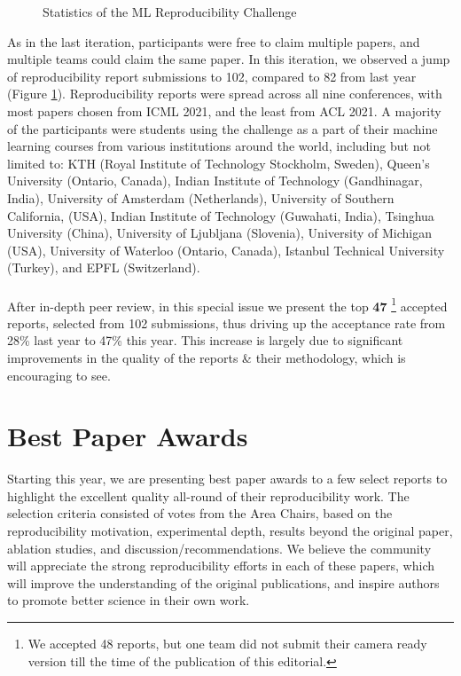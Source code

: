 \begin{figure}%
    \centering
    \qquad
    \caption{Statistics of the ML Reproducibility Challenge}%
    \label{fig:rcstats}%
\end{figure}

As in the last iteration, participants were free to claim multiple papers, and multiple teams could claim the same paper. In this iteration, we observed a jump of reproducibility report submissions to 102, compared to 82 from last year (Figure \ref{fig:rcstats}). Reproducibility reports were spread across all nine conferences, with most papers chosen from ICML 2021, and the least from ACL 2021. A majority of the participants were students using the challenge as a part of their machine learning courses from various institutions around the world, including but not limited to: KTH (Royal Institute of Technology Stockholm, Sweden), Queen's University (Ontario, Canada), Indian Institute of Technology (Gandhinagar, India), University of Amsterdam (Netherlands), University of Southern California, (USA), Indian Institute of Technology (Guwahati, India), Tsinghua University (China), University of Ljubljana (Slovenia), University of Michigan (USA), University of Waterloo (Ontario, Canada), Istanbul Technical University (Turkey), and EPFL (Switzerland).
\\
\\
After in-depth peer review, in this special issue we present the top \textbf{47} \footnote{We accepted 48 reports, but one team did not submit their camera ready version till the time of the publication of this editorial.} accepted reports, selected from 102 submissions, thus driving up the acceptance rate from 28\% last year to 47\% this year. This increase is largely due to significant improvements in the quality of the reports \& their methodology, which is encouraging to see.

\section{Best Paper Awards}

Starting this year, we are presenting best paper awards to a few select reports to highlight the excellent quality all-round of their reproducibility work. The selection criteria consisted of votes from the Area Chairs, based on the reproducibility motivation, experimental depth, results beyond the original paper, ablation studies, and discussion/recommendations. We believe the community will appreciate the strong reproducibility efforts in each of these papers, which will improve the understanding of the original publications, and inspire authors to promote better science in their own work.


